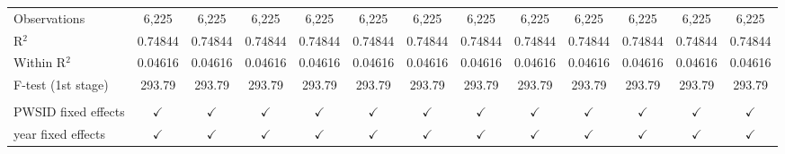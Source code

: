 \begin{table}[htbp]
\begin{adjustbox}{width = \textwidth, center}
\begin{tabular}{lcccccccccccc}
          \\
         Observations                            & 6,225                   & 6,225                  & 6,225                                & 6,225                        & 6,225                         & 6,225                        & 6,225                                      & 6,225                              & 6,225                        & 6,225                       & 6,225                                     & 6,225\\  
         R$^2$                                   & 0.74844                 & 0.74844                & 0.74844                              & 0.74844                      & 0.74844                       & 0.74844                      & 0.74844                                    & 0.74844                            & 0.74844                      & 0.74844                     & 0.74844                                   & 0.74844\\  
         Within R$^2$                            & 0.04616                 & 0.04616                & 0.04616                              & 0.04616                      & 0.04616                       & 0.04616                      & 0.04616                                    & 0.04616                            & 0.04616                      & 0.04616                     & 0.04616                                   & 0.04616\\  
         F-test (1st stage)                      & 293.79                  & 293.79                 & 293.79                               & 293.79                       & 293.79                        & 293.79                       & 293.79                                     & 293.79                             & 293.79                       & 293.79                      & 293.79                                    & 293.79\\  
          \\
         PWSID fixed effects                     & $\checkmark$            & $\checkmark$           & $\checkmark$                         & $\checkmark$                 & $\checkmark$                  & $\checkmark$                 & $\checkmark$                               & $\checkmark$                       & $\checkmark$                 & $\checkmark$                & $\checkmark$                              & $\checkmark$\\   
         year fixed effects                      & $\checkmark$            & $\checkmark$           & $\checkmark$                         & $\checkmark$                 & $\checkmark$                  & $\checkmark$                 & $\checkmark$                               & $\checkmark$                       & $\checkmark$                 & $\checkmark$                & $\checkmark$                              & $\checkmark$\\   
         \bottomrule
      \end{tabular}
   \end{adjustbox}
\end{table}


